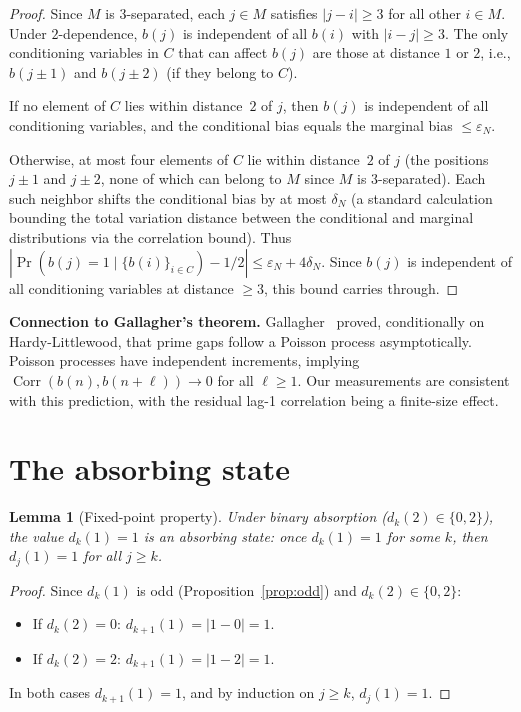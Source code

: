 \documentclass[11pt, a4paper]{amsart}
\theoremstyle{plain}
\newtheorem{lemma}[theorem]{Lemma}
\theoremstyle{definition}
\renewcommand{\Pr}{\operatorname{Pr}}
\newcommand{\Corr}{\operatorname{Corr}}
\begin{document}
\begin{proof}
Since $M$ is $3$-separated, each $j \in M$ satisfies $|j - i| \ge 3$ for all other $i \in M$.
Under $2$-dependence, $b(j)$ is independent of all $b(i)$ with $|i - j| \ge 3$.
The only conditioning variables in $C$ that can affect $b(j)$ are those at distance $1$ or $2$,
i.e., $b(j \pm 1)$ and $b(j \pm 2)$ (if they belong to $C$).

If no element of $C$ lies within distance~$2$ of $j$, then $b(j)$ is independent of all conditioning variables,
and the conditional bias equals the marginal bias $\le \varepsilon_N$.

Otherwise, at most four elements of $C$ lie within distance~$2$ of $j$
(the positions $j \pm 1$ and $j \pm 2$, none of which can belong to $M$ since $M$ is $3$-separated).
Each such neighbor shifts the conditional bias by at most $\delta_N$
(a standard calculation bounding the total variation distance between the conditional and marginal distributions
via the correlation bound). Thus $|\Pr(b(j)=1 \mid \{b(i)\}_{i \in C}) - 1/2| \le \varepsilon_N + 4\delta_N$.
Since $b(j)$ is independent of all conditioning variables at distance $\ge 3$, this bound carries through.
\end{proof}

\textbf{Connection to Gallagher's theorem.} Gallagher~\cite{Gallagher1976} proved, conditionally on Hardy-Littlewood, that prime gaps follow a 
Poisson process asymptotically. Poisson processes have independent increments, implying $\Corr(b(n), b(n+\ell)) \to 0$ for all $\ell \ge 1$. 
Our measurements are consistent with this prediction, with the residual lag-1 correlation being a finite-size effect.

\section{The absorbing state}
\label{sec:absorbing}

\begin{lemma}[Fixed-point property]\label{lem:fixed-point}
Under binary absorption ($d_k(2) \in \{0, 2\}$), the value $d_k(1) = 1$ is an \emph{absorbing state}:
once $d_k(1) = 1$ for some $k$, then $d_j(1) = 1$ for all $j \ge k$.
\end{lemma}

\begin{proof}
Since $d_k(1)$ is odd (Proposition~\ref{prop:odd}) and $d_k(2) \in \{0, 2\}$:
\begin{itemize}
\item If $d_k(2) = 0$: $d_{k+1}(1) = |1 - 0| = 1$.
\item If $d_k(2) = 2$: $d_{k+1}(1) = |1 - 2| = 1$.
\end{itemize}
In both cases $d_{k+1}(1) = 1$, and by induction on $j \ge k$, $d_j(1) = 1$.
\end{proof}
\end{document}
